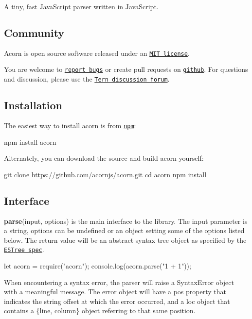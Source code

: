 A tiny, fast Java\+Script parser written in Java\+Script.

\subsection*{Community}

Acorn is open source software released under an \href{https://github.com/acornjs/acorn/blob/master/acorn/LICENSE}{\tt M\+IT license}.

You are welcome to \href{https://github.com/acornjs/acorn/issues}{\tt report bugs} or create pull requests on \href{https://github.com/acornjs/acorn}{\tt github}. For questions and discussion, please use the \href{https://discuss.ternjs.net}{\tt Tern discussion forum}.

\subsection*{Installation}

The easiest way to install acorn is from \href{https://www.npmjs.com/}{\tt {\ttfamily npm}}\+:


\begin{DoxyCode}
npm install acorn
\end{DoxyCode}


Alternately, you can download the source and build acorn yourself\+:


\begin{DoxyCode}
git clone https://github.com/acornjs/acorn.git
cd acorn
npm install
\end{DoxyCode}


\subsection*{Interface}

{\bfseries parse}{\ttfamily (input, options)} is the main interface to the library. The {\ttfamily input} parameter is a string, {\ttfamily options} can be undefined or an object setting some of the options listed below. The return value will be an abstract syntax tree object as specified by the \href{https://github.com/estree/estree}{\tt E\+S\+Tree spec}.


\begin{DoxyCode}
let acorn = require("acorn");
console.log(acorn.parse("1 + 1"));
\end{DoxyCode}


When encountering a syntax error, the parser will raise a {\ttfamily Syntax\+Error} object with a meaningful message. The error object will have a {\ttfamily pos} property that indicates the string offset at which the error occurred, and a {\ttfamily loc} object that contains a {\ttfamily \{line, column\}} object referring to that same position.

